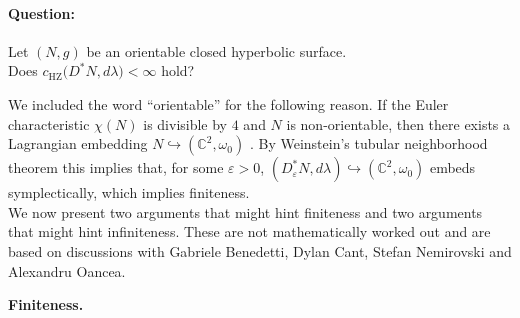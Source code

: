 \documentclass[11pt]{article}
\theoremstyle{definition}
\begin{document}
\paragraph{Question:}\begin{center}
    Let $(N,g)$ be an orientable closed hyperbolic surface.\\ Does $c_{\mathrm{HZ}}\bigl(D^{*}N,d\lambda\bigr)<\infty$ hold?
\end{center}

\vspace{1em}

We included the word ``orientable'' for the following reason. If the Euler
characteristic $\chi(N)$ is divisible by $4$ and $N$ is non-orientable,
then there exists a Lagrangian embedding $N\hookrightarrow (\mathbb{C}^{2},\omega_{0})$ \cite{Giv86}. By Weinstein's tubular neighborhood theorem this implies that, for some
$\varepsilon>0$, $(D^{*}_{\varepsilon}N,d\lambda)\hookrightarrow (\mathbb C^{2},\omega_{0})$ embeds symplectically, which implies finiteness.\\

We now present two arguments that might hint finiteness and two arguments that might hint infiniteness. These are not mathematically worked out and are based on discussions with Gabriele Benedetti, Dylan Cant, Stefan Nemirovski and Alexandru Oancea.

\medskip
\noindent\textbf{Finiteness.}
\end{document}
